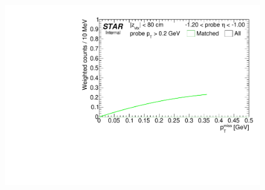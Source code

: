 \begin{figure}[ht]
{  \includegraphics[width=\linewidth,page=11]{graphics/correctionsToEff/TOF_tagAndProbe/Fitting_effVsEta_mc.CPT.pdf}
}%
\end{figure}


